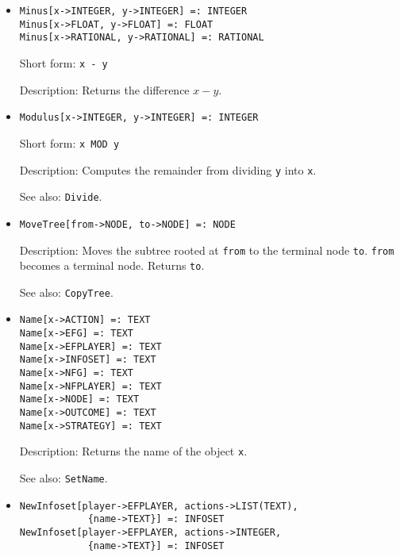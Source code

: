 \begin{itemize}
\item 
\protect \large \begin{verbatim}
Minus[x->INTEGER, y->INTEGER] =: INTEGER
Minus[x->FLOAT, y->FLOAT] =: FLOAT
Minus[x->RATIONAL, y->RATIONAL] =: RATIONAL
\end{verbatim} \normalsize

\bd
\item
[Short form:] \verb+x - y+
\item
[Description:] Returns the difference $x - y$.
\ed

\item
\protect \large \begin{verbatim}
Modulus[x->INTEGER, y->INTEGER] =: INTEGER
\end{verbatim}\normalsize

\bd
\item
[Short form:] \verb+x MOD y+
\item
[Description:] Computes the remainder from dividing \verb+y+ into \verb+x+.
\item
[See also:] {\tt Divide}.
\ed


\item
\protect \large \begin{verbatim}
MoveTree[from->NODE, to->NODE] =: NODE
\end{verbatim}\normalsize

\bd
\item
[Description:] Moves the subtree rooted at \verb+from+ to
the terminal node \verb+to+.  \verb+from+ becomes a terminal node.
Returns \verb+to+.
\item
[See also:] {\tt CopyTree}.
\ed


\item
\protect \large \begin{verbatim}
Name[x->ACTION] =: TEXT
Name[x->EFG] =: TEXT
Name[x->EFPLAYER] =: TEXT
Name[x->INFOSET] =: TEXT
Name[x->NFG] =: TEXT
Name[x->NFPLAYER] =: TEXT
Name[x->NODE] =: TEXT
Name[x->OUTCOME] =: TEXT
Name[x->STRATEGY] =: TEXT
\end{verbatim}\normalsize

\bd
\item
[Description:] Returns the name of the object \verb+x+.
\item
[See also:] {\tt SetName}.
\ed


\item
\protect \large \begin{verbatim} 
NewInfoset[player->EFPLAYER, actions->LIST(TEXT),
            {name->TEXT}] =: INFOSET
NewInfoset[player->EFPLAYER, actions->INTEGER,
            {name->TEXT}] =: INFOSET
\end{verbatim}\normalsize


\end{itemize}
